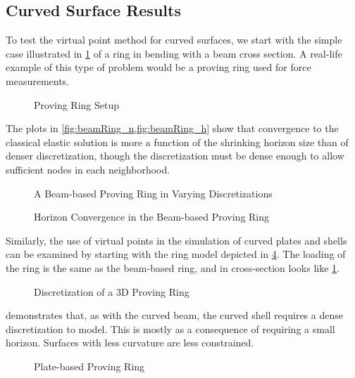 \FloatBarrier
\subsection{Curved Surface Results}
To test the virtual point method for curved surfaces, we start with the simple case illustrated in \cref{fig:ProvingRing} of a ring in bending with a beam cross section.
A real-life example of this type of problem would be a proving ring used for force measurements.
%
\begin{figure}[tbhp]
  \centering
  
  \caption{Proving Ring Setup}
  \label{fig:ProvingRing}
\end{figure}
%
The plots in \cref{fig:beamRing_n,fig:beamRing_h} show that convergence to the classical elastic solution is more a function of the shrinking horizon size than of denser discretization, though the discretization must be dense enough to allow sufficient nodes in each neighborhood.
%
\begin{figure}[tbhp]
  \centering
  \resizebox{0.8\linewidth}{!}{}
  \caption{A Beam-based Proving Ring in Varying Discretizations}
  \label{fig:beamRing_n}
\end{figure}
%
%
\begin{figure}[tbhp]
  \centering
  \resizebox{0.8\linewidth}{!}{}
  \caption{Horizon Convergence in the Beam-based Proving Ring}
  \label{fig:beamRing_h}
\end{figure}
%

Similarly, the use of virtual points in the simulation of curved plates and shells can be examined by starting with the ring model depicted in \cref{fig:PlateRing}.
The loading of the ring is the same as the beam-based ring, and in cross-section looks like \cref{fig:ProvingRing}.
%
\begin{figure}[tbhp]
  \centering
  \vspace{-35mm}
  \resizebox{0.9\linewidth}{!}{}
  \vspace{-35mm}
  \caption{Discretization of a 3D Proving Ring}
  \label{fig:PlateRing}
\end{figure}
%


 demonstrates that, as with the curved beam, the curved shell requires a dense discretization to model.
This is mostly as a consequence of requiring a small horizon.
Surfaces with less curvature are less constrained.

%
\begin{figure}[tbhp]
  \centering
  \resizebox{0.8\linewidth}{!}{}
  \caption{Plate-based Proving Ring}
  \label{fig:PlateRing_n}
\end{figure}
%

